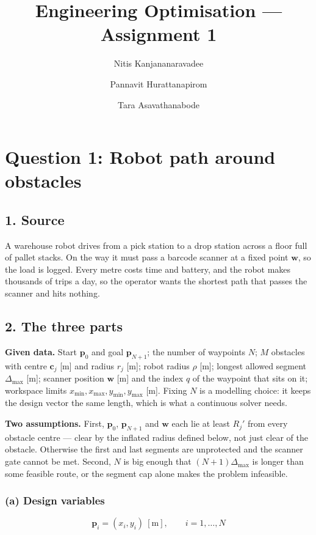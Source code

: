 \documentclass[11pt,a4paper]{article}
\title{Engineering Optimisation --- Assignment 1}
\author{Nitis Kanjananaravadee \and Pannavit Hurattanapirom \and Tara Asavathanabode}
\date{}
\begin{document}
\maketitle

\section*{Question 1: Robot path around obstacles}

\subsection*{1. Source}

A warehouse robot drives from a pick station to a drop station across a floor
full of pallet stacks. On the way it must pass a barcode scanner at a fixed
point $\bm{w}$, so the load is logged. Every metre costs time and battery, and
the robot makes thousands of trips a day, so the operator wants the shortest
path that passes the scanner and hits nothing.

\subsection*{2. The three parts}

\textbf{Given data.} Start $\bm{p}_0$ and goal $\bm{p}_{N+1}$; the number of
waypoints $N$; $M$ obstacles with centre $\bm{c}_j$ [m] and radius $r_j$ [m];
robot radius $\rho$ [m]; longest allowed segment $\Delta_{\max}$ [m]; scanner
position $\bm{w}$ [m] and the index $q$ of the waypoint that sits on it;
workspace limits $x_{\min}, x_{\max}, y_{\min}, y_{\max}$ [m]. Fixing $N$ is a
modelling choice: it keeps the design vector the same length, which is what a
continuous solver needs.

\textbf{Two assumptions.} First, $\bm{p}_0$, $\bm{p}_{N+1}$ and $\bm{w}$ each
lie at least $R_j'$ from every obstacle centre --- clear by the inflated radius
defined below, not just clear of the obstacle. Otherwise the first and last
segments are unprotected and the scanner gate cannot be met. Second, $N$ is big
enough that $(N+1)\Delta_{\max}$ is longer than some feasible route, or the
segment cap alone makes the problem infeasible.

\subsubsection*{(a) Design variables}

\[
  \bm{p}_i = (x_i, y_i) \ [\mathrm{m}], \qquad i = 1,\dots,N
\]
\end{document}
